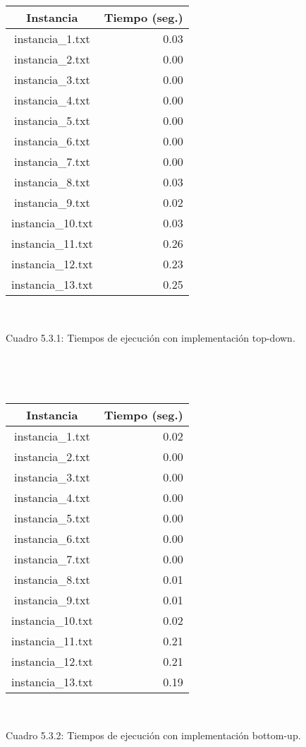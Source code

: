 \documentclass[10pt, a4paper]{article}
\begin{document}
\begin{center}
\begin{tabular}{ c r } 
Instancia & Tiempo (seg.) \\
\hline
instancia\_1.txt & 0.03 \\
instancia\_2.txt & 0.00 \\
instancia\_3.txt & 0.00 \\
instancia\_4.txt & 0.00 \\
instancia\_5.txt & 0.00 \\
instancia\_6.txt & 0.00 \\
instancia\_7.txt & 0.00 \\
instancia\_8.txt & 0.03 \\
instancia\_9.txt & 0.02 \\
instancia\_10.txt & 0.03 \\
instancia\_11.txt & 0.26 \\
instancia\_12.txt & 0.23 \\
instancia\_13.txt & 0.25 \\
\end{tabular} 

\

Cuadro 5.3.1: Tiempos de ejecución con implementación top-down.

\

\

\begin{tabular}{ c r } 
Instancia & Tiempo (seg.) \\
\hline
instancia\_1.txt & 0.02 \\
instancia\_2.txt & 0.00 \\
instancia\_3.txt & 0.00 \\
instancia\_4.txt & 0.00 \\
instancia\_5.txt & 0.00 \\
instancia\_6.txt & 0.00 \\
instancia\_7.txt & 0.00 \\
instancia\_8.txt & 0.01 \\
instancia\_9.txt & 0.01 \\
instancia\_10.txt & 0.02 \\
instancia\_11.txt & 0.21 \\
instancia\_12.txt & 0.21 \\
instancia\_13.txt & 0.19 \\
\end{tabular} 

\

Cuadro 5.3.2: Tiempos de ejecución con implementación bottom-up.
\end{center}
\end{document}
